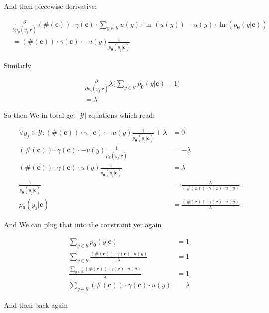 \documentclass{article}
\newcommand{\vtheta}{\boldsymbol{\theta}}
\newcommand{\model}{p_{\vtheta}}
\newcommand{\context}{\boldsymbol{c}}
\begin{document}
			And then piecewise derivative:
			
			\begin{align}
				& \frac{\partial}{\partial \model(y_j|\context)} (\#(\context))\cdot \gamma(\context)\cdot  \sum_{y\in\mathcal{Y}} u(y)\cdot\ln(u(y)) - u(y)\cdot\ln(\model(y|\context))\\
				&=  (\#(\context))\cdot \gamma(\context)\cdot    - u(y)\frac{1}{\model(y_j|\context)}
			\end{align}
			
			Similarly
			
			\begin{align}
				&\frac{\partial}{\partial \model(y_j|\context)} \lambda\bigg(\sum_{y\in\mathcal{Y}} \model(y|\context) -1 \bigg)\\
				&=\lambda
			\end{align}
			
			So then We in total get $|\mathcal{Y}|$ equations which read:
			
			\begin{align}
				 \forall y_j\in\mathcal{Y}:(\#(\context))\cdot \gamma(\context)\cdot    - u(y)\frac{1}{\model(y_j|\context)} + \lambda &= 0\\
				(\#(\context))\cdot \gamma(\context)\cdot - u(y)\frac{1}{\model(y_j|\context)}  &= -\lambda\\
				(\#(\context))\cdot \gamma(\context)\cdot u(y)\frac{1}{\model(y_j|\context)}  &= \lambda\\
				\frac{1}{\model(y_j|\context)}  &= \frac{\lambda}{(\#(\context))\cdot \gamma(\context)\cdot u(y)}\\
				\model(y_j|\context)  &= \frac{(\#(\context))\cdot \gamma(\context)\cdot u(y)}{\lambda}
			\end{align}
			
			And We can plug that into the constraint yet again
			
			\begin{align}
				\sum_{y\in\mathcal{Y}} \model(y|\context) &= 1\\
				\sum_{y\in\mathcal{Y}} \frac{(\#(\context))\cdot \gamma(\context)\cdot u(y)}{\lambda} &= 1\\
				 \frac{\sum_{y\in\mathcal{Y}} (\#(\context))\cdot \gamma(\context)\cdot u(y)}{\lambda} &= 1\\
				 \sum_{y\in\mathcal{Y}} (\#(\context))\cdot \gamma(\context)\cdot u(y) &= \lambda
			\end{align}
			
			And then back again
			
\end{document}
